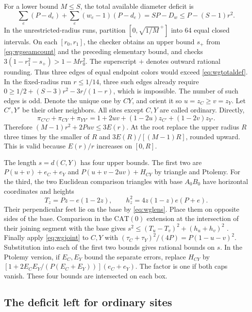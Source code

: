 \documentclass[11pt,a4paper]{article}
\theoremstyle{definition}
\begin{document}
For a lower bound $M\le S$, the total available diameter deficit is
\begin{equation}
 \sum_e(P-d_e)+\sum_e(w_e-1)(P-d_e)
 =SP-D_w\le P-(S-1)r^2.\label{eq:wgtotaldef}
\end{equation}
In the unrestricted-radius runs, partition $[0,\sqrt{1/M}^{\,+}]$
into 64 equal closed intervals. On each $[r_0,r_1]$, the checker
obtains an upper bound $s_+$ from \eqref{eq:wgseamcount} and the
preceding elementary bound, and checks
$3(1-r_1^2-s_+)>1-Mr_0^2$. The superscript $+$ denotes outward
rational rounding. Thus three edges of equal endpoint colors would
exceed \eqref{eq:wgtotaldef}. In the fixed-radius run $r\le1/14$,
three such edges already require
$0\ge1/2+(S-3)r^2-3r/(1-r)$, which is impossible.
The number of such edges is odd. Denote the unique one by $CY$,
and orient it so $u=z_C\ge v=z_Y$. Let $C',Y'$ be their other
neighbors. All sites except $C,Y$ are called ordinary. Directly,
\begin{equation}
 \pi_{C'C}+\pi_{CY}+\pi_{YY'}
 =1+2uv+(1-2u)z_{C'}+(1-2v)z_{Y'} .\label{eq:wgspecial}
\end{equation}
Therefore $(M-1)r^2+2Puv\le3E(r)$. At the root replace the
upper radius $R$ three times by the smaller of $R$ and
$3E(R)/[(M-1)R]$, rounded upward. This is valid because
$E(r)/r$ increases on $[0,R]$.

The length $s=d(C,Y)$ has four upper bounds. The first two are
$P(u+v)+e_C+e_Y$ and $P(u+v-2uv)+H_{CY}$ by triangle and Ptolemy.
For the third, the two Euclidean comparison triangles with base
$A_0B_0$ have horizontal coordinates and heights
\[
 T_z=Pz-e(1-2z),\qquad h_z^2=4z(1-z)e(P+e).
\]
Their perpendicular feet lie on the base by \eqref{eq:wglens}.
Place them on opposite sides of the base. Comparison in the
$\mathrm{CAT}(0)$ extension at the intersection of their joining
segment with the base gives
$s^2\le(T_u-T_v)^2+(h_u+h_v)^2$ \cite{CAT,Jiang}.
Finally apply \eqref{eq:wgjoint} to $C,Y$ with
$(\tau_C+\tau_Y)^2/(4P)=P(1-u-v)^2$.
Substitution into each of the first two bounds gives rational bounds
on $s$. In the Ptolemy version, if $E_C,E_Y$ bound the separate
errors, replace $H_{CY}$ by
$[1+2E_CE_Y/(P(E_C+E_Y))](e_C+e_Y)$. The factor is one
if both caps vanish. These four bounds are intersected on each box.

\subsection{The deficit left for ordinary sites}
\end{document}
